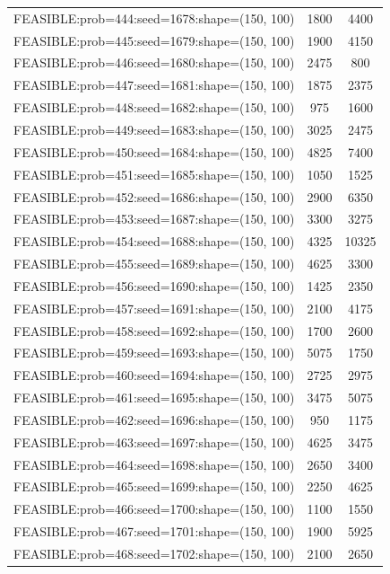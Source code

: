 \begin{longtable}{lcc}
FEASIBLE:prob=444:seed=1678:shape=(150, 100) &     1800 &  4400 \\
FEASIBLE:prob=445:seed=1679:shape=(150, 100) &     1900 &  4150 \\
FEASIBLE:prob=446:seed=1680:shape=(150, 100) &     2475 &   800 \\
FEASIBLE:prob=447:seed=1681:shape=(150, 100) &     1875 &  2375 \\
FEASIBLE:prob=448:seed=1682:shape=(150, 100) &      975 &  1600 \\
FEASIBLE:prob=449:seed=1683:shape=(150, 100) &     3025 &  2475 \\
FEASIBLE:prob=450:seed=1684:shape=(150, 100) &     4825 &  7400 \\
FEASIBLE:prob=451:seed=1685:shape=(150, 100) &     1050 &  1525 \\
FEASIBLE:prob=452:seed=1686:shape=(150, 100) &     2900 &  6350 \\
FEASIBLE:prob=453:seed=1687:shape=(150, 100) &     3300 &  3275 \\
FEASIBLE:prob=454:seed=1688:shape=(150, 100) &     4325 & 10325 \\
FEASIBLE:prob=455:seed=1689:shape=(150, 100) &     4625 &  3300 \\
FEASIBLE:prob=456:seed=1690:shape=(150, 100) &     1425 &  2350 \\
FEASIBLE:prob=457:seed=1691:shape=(150, 100) &     2100 &  4175 \\
FEASIBLE:prob=458:seed=1692:shape=(150, 100) &     1700 &  2600 \\
FEASIBLE:prob=459:seed=1693:shape=(150, 100) &     5075 &  1750 \\
FEASIBLE:prob=460:seed=1694:shape=(150, 100) &     2725 &  2975 \\
FEASIBLE:prob=461:seed=1695:shape=(150, 100) &     3475 &  5075 \\
FEASIBLE:prob=462:seed=1696:shape=(150, 100) &      950 &  1175 \\
FEASIBLE:prob=463:seed=1697:shape=(150, 100) &     4625 &  3475 \\
FEASIBLE:prob=464:seed=1698:shape=(150, 100) &     2650 &  3400 \\
FEASIBLE:prob=465:seed=1699:shape=(150, 100) &     2250 &  4625 \\
FEASIBLE:prob=466:seed=1700:shape=(150, 100) &     1100 &  1550 \\
FEASIBLE:prob=467:seed=1701:shape=(150, 100) &     1900 &  5925 \\
FEASIBLE:prob=468:seed=1702:shape=(150, 100) &     2100 &  2650 \\

\end{longtable}
